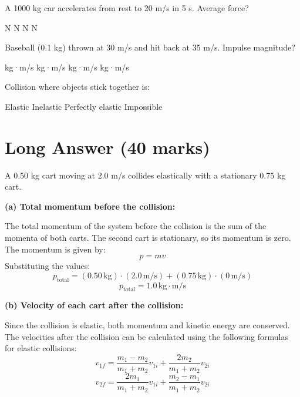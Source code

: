 \documentclass[addpoints]{exam}
\begin{document}
\begin{questions}
\begin{questions}
\question[1] A 1000 kg car accelerates from rest to 20 m/s in 5 s. Average force?
\begin{choices}
     N
     N
     N
     N
\end{choices}

\question[1] Baseball (0.1 kg) thrown at 30 m/s and hit back at 35 m/s. Impulse magnitude?
\begin{choices}
     kg·m/s
     kg·m/s
     kg·m/s
     kg·m/s
\end{choices}

\question[1] Collision where objects stick together is:
\begin{choices}
    \choice Elastic
    \correctchoice Inelastic
    \choice Perfectly elastic
    \choice Impossible
\end{choices}


\section*{Long Answer (40 marks)}

\question A 0.50 kg cart moving at 2.0 m/s collides elastically with a stationary 0.75 kg cart.
\begin{solution}[6cm]
\textbf{(a) Total momentum before the collision:}  

The total momentum of the system before the collision is the sum of the momenta of both carts. The second cart is stationary, so its momentum is zero. The momentum is given by:  
\[
p = m v
\]  
Substituting the values:  
\[
p_\text{total} = (0.50 \, \text{kg}) \cdot (2.0 \, \text{m/s}) + (0.75 \, \text{kg}) \cdot (0 \, \text{m/s})
\]  
\[
p_\text{total} = 1.0 \, \text{kg} \cdot \text{m/s}
\]  

\textbf{(b) Velocity of each cart after the collision:}  

Since the collision is elastic, both momentum and kinetic energy are conserved. The velocities after the collision can be calculated using the following formulas for elastic collisions:
\[
v_{1f} = \frac{m_1 - m_2}{m_1 + m_2} v_{1i} + \frac{2 m_2}{m_1 + m_2} v_{2i}
\]
\[
v_{2f} = \frac{2 m_1}{m_1 + m_2} v_{1i} + \frac{m_2 - m_1}{m_1 + m_2} v_{2i}
\]  


\end{solution}
\end{questions}
\end{questions}
\end{document}

